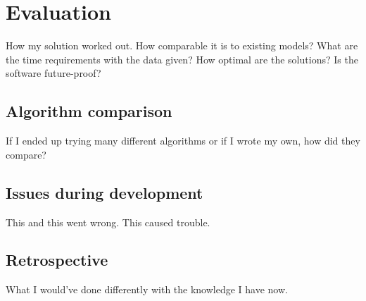\chapter{Evaluation}
\label{chapter:evaluation}

How my solution worked out. How comparable it is to existing models? What are the time requirements with the data given? How optimal are the solutions? Is the software future-proof?


\section{Algorithm comparison}

If I ended up trying many different algorithms or if I wrote my own, how did they compare?



\section{Issues during development}

This and this went wrong. This caused trouble.


\section{Retrospective}

What I would've done differently with the knowledge I have now.